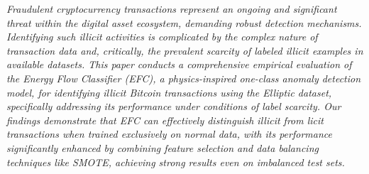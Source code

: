 \emph{Fraudulent cryptocurrency transactions represent an ongoing and significant threat within the digital asset ecosystem,
demanding robust detection mechanisms. Identifying such illicit activities is complicated by the complex nature of transaction
data and, critically, the prevalent scarcity of labeled illicit examples in available datasets. This paper conducts a comprehensive
empirical evaluation of the Energy Flow Classifier (EFC), a physics-inspired one-class anomaly detection model, for identifying
illicit Bitcoin transactions using the Elliptic dataset, specifically addressing its performance under conditions of label
scarcity. Our findings demonstrate that EFC can effectively distinguish illicit from licit transactions when trained
exclusively on normal data, with its performance significantly enhanced by combining feature selection and data balancing
techniques like SMOTE, achieving strong results even on imbalanced test sets.}
